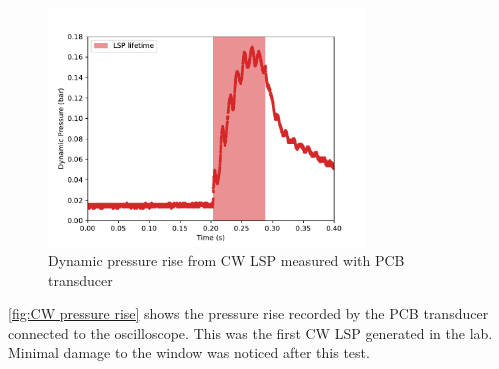             \begin{figure}[!ht]
                \centering
                \includegraphics[width=0.75\textwidth]{assets/4 experiments/CW pressure rise.pdf}
                \caption{Dynamic pressure rise from CW LSP measured with PCB transducer}
                \label{fig:CW pressure rise}
            \end{figure}

            \autoref{fig:CW pressure rise} shows the pressure rise recorded by the PCB transducer connected to the oscilloscope. This was the first CW LSP generated in the lab.  Minimal damage to the window was noticed after this test.


    
    
    
    
